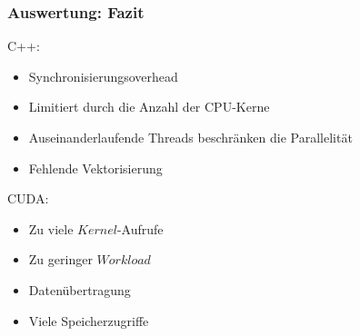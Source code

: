 \documentclass[xcolor=pdftex,dvipsnames,table]{beamer}
\begin{document}
\begin{frame}
	\frametitle{Auswertung: Fazit}
		C++:
		\begin{itemize}
			\item Synchronisierungsoverhead 
			\item Limitiert durch die Anzahl der CPU-Kerne
			\item Auseinanderlaufende Threads beschränken die Parallelität
			\item Fehlende Vektorisierung
		\end{itemize}
	
	
		CUDA:
		\begin{itemize}
			\item Zu viele $Kernel$-Aufrufe
			\item Zu geringer $Workload$
			\item Datenübertragung		
			\item Viele Speicherzugriffe
		\end{itemize}
\end{frame}
\end{document}
